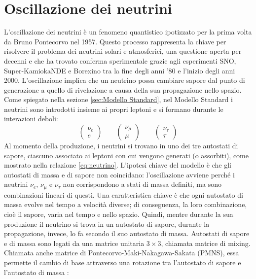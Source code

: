\section{Oscillazione dei neutrini}
L'oscillazione dei neutrini è un fenomeno quantistico ipotizzato per la prima volta da Bruno Pontecorvo nel 1957. Questo processo rappresenta la chiave per risolvere il problema dei neutrini solari e atmosferici, una questione aperta per decenni e che ha trovato conferma sperimentale grazie agli esperimenti SNO, Super-KamiokaNDE e Borexino tra la fine degli anni '80 e l'inizio degli anni 2000. L'oscillazione implica che un neutrino possa cambiare sapore dal punto di generazione a quello di rivelazione a causa della sua propagazione nello spazio. Come spiegato nella sezione \ref{sec:Modello Standard}, nel Modello Standard i neutrini sono introdotti insieme ai propri leptoni e si formano durante le interazioni deboli:
\begin{equation}
    \left(\begin{array}{l} \nu_e \\ e \end{array}\right)\qquad \left(\begin{array}{l} \nu_\mu \\ \mu \end{array}\right)\qquad \left(\begin{array}{l} \nu_\tau \\ \tau \end{array}\right)
    \label{eq:neutrino}
\end{equation}
Al momento della produzione, i neutrini si trovano in uno dei tre autostati di sapore, ciascuno associato ai leptoni con cui vengono generati (o assorbiti), come mostrato nella relazione \ref{eq:neutrino}. L'ipotesi chiave del modello è che gli autostati di massa e di sapore non coincidano: l'oscillazione avviene perché i neutrini $\nu_e$, $\nu_\mu$ e $\nu_\tau$ non corrispondono a stati di massa definiti, ma sono combinazioni lineari di questi. Una caratteristica chiave è che ogni autostato di massa evolve nel tempo a velocità diverse; di conseguenza, la loro combinazione, cioè il sapore, varia nel tempo e nello spazio. Quindi, mentre durante la sua produzione il neutrino si trova in un autostato di sapore, durante la propagazione, invece, lo fa secondo il suo autostato di massa. Autostati di sapore e di massa sono legati da una matrice unitaria $3\times3$, chiamata matrice di mixing. Chiamata anche matrice di Pontecorvo-Maki-Nakagawa-Sakata (PMNS), essa permette il cambio di base attraverso una rotazione tra l'autostato di sapore e l'autostato di massa \cite{alma991014412219706031}:
